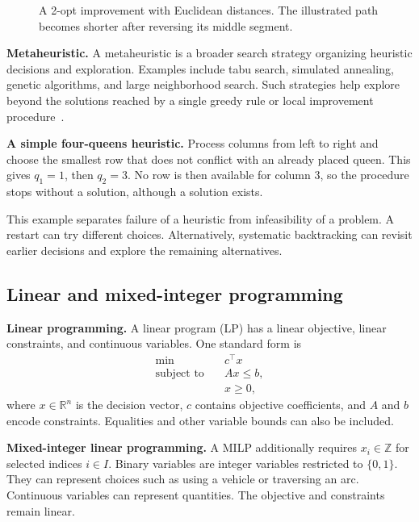 \begin{figure}[htbp]
 \centering
 
 \caption{A 2-opt improvement with Euclidean distances. The illustrated path
 becomes shorter after reversing its middle segment.}
 \label{fig:two-opt}
\end{figure}

\textbf{Metaheuristic.} A metaheuristic is a broader search strategy organizing
heuristic decisions and exploration. Examples include tabu search, simulated
annealing, genetic algorithms, and large neighborhood search. Such strategies
help explore beyond the solutions reached by a single greedy rule or local
improvement procedure~\cite{laporte2000heuristics,shaw1998constraint}.

\textbf{A simple four-queens heuristic.} Process columns from left to right
and choose the smallest row that does not conflict with an already placed
queen. This gives $q_1=1$, then $q_2=3$. No row is then available for column
3, so the procedure stops without a solution, although a solution exists.

This example separates failure of a heuristic from infeasibility of a problem.
A restart can try different choices. Alternatively, systematic backtracking
can revisit earlier decisions and explore the remaining alternatives.

\subsection{Linear and mixed-integer programming}

\textbf{Linear programming.} A linear program (LP) has a linear objective,
linear constraints, and continuous variables. One standard form is
\begin{align*}
 \min\quad & c^\top x\\
 \text{subject to}\quad & Ax\leq b,\\
 & x\geq 0,
\end{align*}
where $x\in\mathbb{R}^n$ is the decision vector, $c$ contains objective
coefficients, and $A$ and $b$ encode constraints. Equalities and other variable
bounds can also be included.

\textbf{Mixed-integer linear programming.} A MILP additionally requires
$x_i\in\mathbb{Z}$ for selected indices $i\in I$. Binary variables are integer
variables restricted to $\{0,1\}$. They can represent choices such as using a
vehicle or traversing an arc. Continuous variables can represent quantities.
The objective and constraints remain linear.

